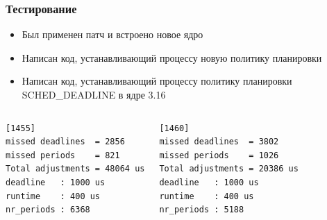 \documentclass[10pt]{beamer}
\begin{document}
\begin{frame}[fragile]\frametitle{Тестирование}
\begin{itemize}
\item Был применен патч и встроено новое ядро
\item Написан код, устанавливающий процессу новую политику планировки
\item Написан код, устанавливающий процессу политику планировки SCHED\_DEADLINE в ядре 3.16
\end{itemize}
\center
	\begin{columns}
		\begin{lstlisting}[style=crs_cpp]	
[1455]
missed deadlines  = 2856
missed periods    = 821
Total adjustments = 48064 us
deadline   : 1000 us
runtime    : 400 us
nr_periods : 6368
 		\end{lstlisting}
 		
		\begin{lstlisting}[style = crs_llvm]
[1460]
missed deadlines  = 3802
missed periods    = 1026
Total adjustments = 20386 us
deadline   : 1000 us
runtime    : 400 us
nr_periods : 5188
 		\end{lstlisting}
 	\end{columns}
\colorbox{white}{\parbox{0.9\textwidth}{{\begin{center}  \end{center} }}}\\
\end{frame}
\end{document}
